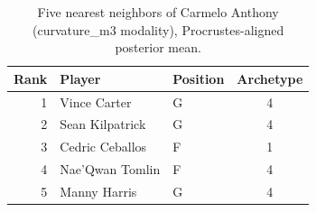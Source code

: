 \begin{table}[htbp]
  \centering\small
  \begin{tabular}{rllc}
    \toprule
    Rank & Player & Position & Archetype \\
    \midrule
    1 & Vince Carter & G & 4 \\
    2 & Sean Kilpatrick & G & 4 \\
    3 & Cedric Ceballos & F & 1 \\
    4 & Nae'Qwan Tomlin & F & 4 \\
    5 & Manny Harris & G & 4 \\
    \bottomrule
  \end{tabular}
  \caption{Five nearest neighbors of Carmelo Anthony (curvature_m3 modality), Procrustes-aligned posterior mean.}
  \label{tab:Carmelo_Anthony_neighbors_curvature_m3}
\end{table}

